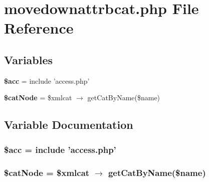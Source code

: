\section{movedownattrbcat.php File Reference}
\label{movedownattrbcat_8php}


\subsection*{Variables}
\begin{CompactItemize}
\item 
{\bf \$acc} = include 'access.php'
\item 
{\bf \$cat\-Node} = \$xmlcat $\rightarrow$ get\-Cat\-By\-Name(\$name)
\end{CompactItemize}


\subsection{Variable Documentation}
\subsubsection{\setlength{\rightskip}{0pt plus 5cm}\$acc = include 'access.php'}\label{movedownattrbcat_8php_542926c588a05eb69553d79c83cf73da}


\subsubsection{\setlength{\rightskip}{0pt plus 5cm}\$cat\-Node = \$xmlcat $\rightarrow$ get\-Cat\-By\-Name(\$name)}\label{movedownattrbcat_8php_6b6a3d0442eb8cc5ad00f6cca24e154f}


